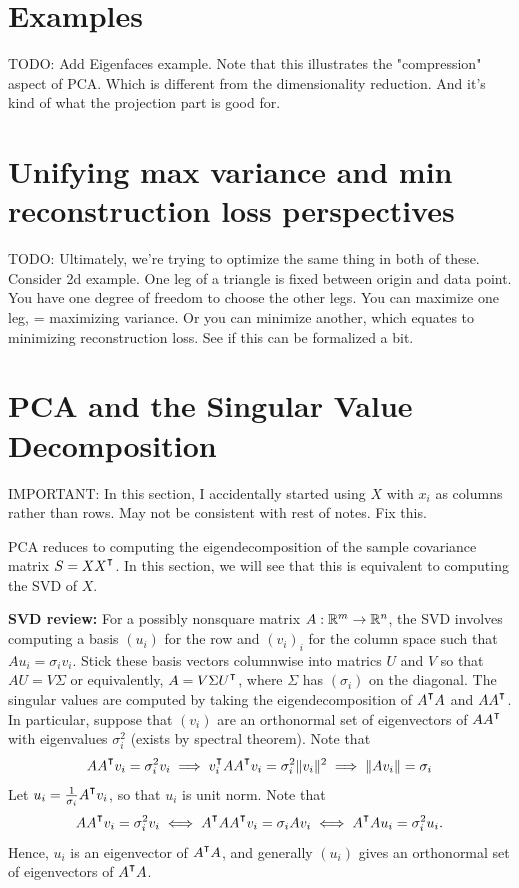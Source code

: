 \section{Examples}
TODO: Add Eigenfaces example. Note that this illustrates the "compression" aspect of PCA. Which is different from the dimensionality reduction. And it's kind of what the projection part is good for. 

\section{Unifying max variance and min reconstruction loss perspectives}
TODO: Ultimately, we're trying to optimize the same thing in both of these. Consider 2d example. One leg of a triangle is fixed between origin and data point. You have one degree of freedom to choose the other legs. You can maximize one leg, = maximizing variance. Or you can minimize another, which equates to minimizing reconstruction loss. See if this can be formalized a bit. 

\section{PCA and the Singular Value Decomposition}
IMPORTANT: In this section, I accidentally started using $X$ with $x_i$ as columns rather than rows. May not be consistent with rest of notes. Fix this. 

PCA reduces to computing the eigendecomposition of the sample covariance matrix $S = XX^\T$. In this section, we will see that this is equivalent to computing the SVD of $X$. 

\vspace{1em}
\noindent \textbf{SVD review:} For a possibly nonsquare matrix $A:\mathbb{R}^m\to\mathbb{R}^n$, the SVD involves computing a basis $(u_i)$ for the row and $(v_i)_i$ for the column space such that $Au_i = \sigma_i v_i$. Stick these basis vectors columnwise into matrics $U$ and $V$ so that $AU = V\Sigma $ or equivalently, $A = V\Sigma U^\T$, where $\Sigma$ has $(\sigma_i)$ on the diagonal. 
The singular values are computed by taking the eigendecomposition of $A^\T A$ and $A A^\T$. In particular, suppose that $(v_i)$ are an orthonormal set of eigenvectors of $AA^\T$ with eigenvalues $\sigma_i^2$ (exists by spectral theorem). Note that
$$
A A^\T v_i = \sigma_i^2 v_i \implies v_i^\T A A^\T v_i = \sigma_i^2 \|v_i\|^2 \implies \|Av_i\| = \sigma_i
$$
Let $u_i = \frac{1}{\sigma_i} A^\T v_i$, so that $u_i$ is unit norm. Note that
$$
AA^\T v_i = \sigma_i^2 v_i \iff A^\T A A^\T v_i = \sigma_i A v_i \iff A^\T A u_i = \sigma_i^2 u_i.
$$
Hence, $u_i$ is an eigenvector of $A^\T A$, and generally $(u_i)$ gives an orthonormal set of eigenvectors of $A^\T A$. 


